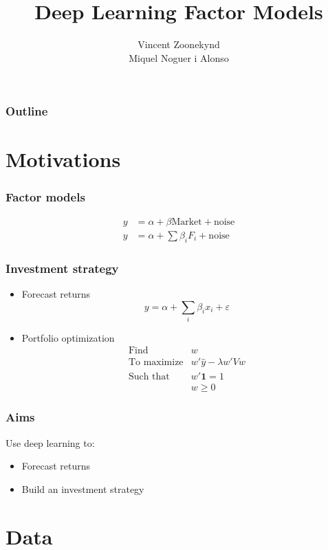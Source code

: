 \documentclass[a4paper,12pt,compress,serif]{beamer}
\title{Deep Learning Factor Models}
\author[Vincent Zoonekynd and Miquel Noguer i Alonso]{Vincent Zoonekynd \\ Miquel Noguer i Alonso} %
\let\geq\geqslant
\let\epsilon\varepsilon
\begin{document}

\begin{frame}
  \titlepage
\end{frame}

\begin{frame}
  \frametitle{Outline}
  \tableofcontents
\end{frame}

\section{Motivations}
\begin{frame}
  \frametitle{Factor models}
  \begin{align*}
    y &= \alpha + \beta \text{Market} + \text{noise} \\[1cm]
    y &= \alpha + \sum \beta_i F_i + \text{noise}
  \end{align*}
\end{frame}

\begin{frame}
  \frametitle{Investment strategy}
  \begin{itemize}
  \item Forecast returns
    \[ y = \alpha + \sum_i \beta_i x_i + \epsilon \]
  \item Portfolio optimization
    \[
    \begin{array}{ll}
      \text{Find} & w \\
      \text{To maximize} & w' \hat y - \lambda w' V w \\
      \text{Such that} & w' \mathbf 1 = 1 \\
      & w \geq 0 
    \end{array}
    \]
  \end{itemize}
\end{frame}

\begin{frame}
  \frametitle{Aims}
  Use deep learning to:
  \begin{itemize}
  \item Forecast returns 
  \item Build an investment strategy
  \end{itemize}
\end{frame}

\section{Data}
\frame{\tableofcontents[currentsection]}
\end{document}

